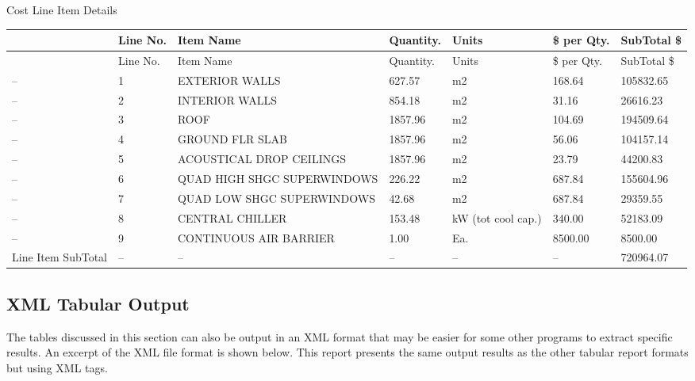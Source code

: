 Cost Line Item Details

\begin{longtable}[c]{>{\raggedright}p{0.85in}>{\raggedright}p{0.85in}>{\raggedright}p{0.85in}>{\raggedright}p{0.85in}>{\raggedright}p{0.85in}>{\raggedright}p{0.85in}>{\raggedright}p{0.85in}}
\toprule
~ & Line No. & Item Name & Quantity. & Units & \$ per Qty. & SubTotal \$ \tabularnewline
\midrule
\endfirsthead

\toprule
~ & Line No. & Item Name & Quantity. & Units & \$ per Qty. & SubTotal \$ \tabularnewline
\midrule
\endhead

-- & 1 & EXTERIOR WALLS & 627.57 & m2 & 168.64 & 105832.65 \tabularnewline
-- & 2 & INTERIOR WALLS & 854.18 & m2 & 31.16 & 26616.23 \tabularnewline
-- & 3 & ROOF & 1857.96 & m2 & 104.69 & 194509.64 \tabularnewline
-- & 4 & GROUND FLR SLAB & 1857.96 & m2 & 56.06 & 104157.14 \tabularnewline
-- & 5 & ACOUSTICAL DROP CEILINGS & 1857.96 & m2 & 23.79 & 44200.83 \tabularnewline
-- & 6 & QUAD HIGH SHGC SUPERWINDOWS & 226.22 & m2 & 687.84 & 155604.96 \tabularnewline
-- & 7 & QUAD LOW SHGC SUPERWINDOWS & 42.68 & m2 & 687.84 & 29359.55 \tabularnewline
-- & 8 & CENTRAL CHILLER & 153.48 & kW (tot cool cap.) & 340.00 & 52183.09 \tabularnewline
-- & 9 & CONTINUOUS AIR BARRIER & 1.00 & Ea. & 8500.00 & 8500.00 \tabularnewline
Line Item SubTotal & -- & -- & -- & -- & -- & 720964.07 \tabularnewline
\bottomrule
\end{longtable}

\subsection{XML Tabular Output}\label{xml-tabular-output}

The tables discussed in this section can also be output in an XML format that may be easier for some other programs to extract specific results. An excerpt of the XML file format is shown below. This report presents the same output results as the other tabular report formats but using XML tags.

